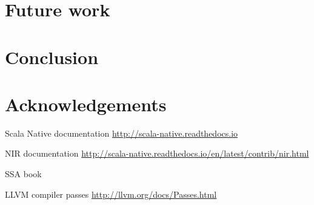 \documentclass[11pt,a4paper]{article}
\begin{document}
\section{Future work}


\section{Conclusion}


\section*{Acknowledgements}

\begin{thebibliography}{9}

    Scala Native documentation \newline \url{http://scala-native.readthedocs.io}

	 NIR documentation \newline \url{http://scala-native.readthedocs.io/en/latest/contrib/nir.html}
	
	 SSA book
	
	 LLVM compiler passes \newline \url{http://llvm.org/docs/Passes.html}

\end{thebibliography}
\end{document}
